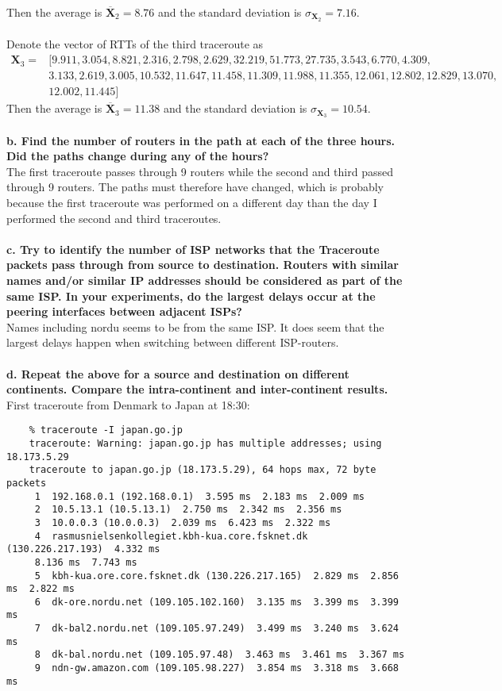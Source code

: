 Then the average is $\overline{\mathbf{X}}_2 = 8.76$ and the standard deviation is $\sigma_{\mathbf{X}_2} = 7.16$. \\
\\
Denote the vector of RTTs of the third traceroute as
\begin{equation*}
\begin{split}
    \mathbf{X}_3 = &[
        9.911, 3.054, 8.821,
        2.316, 2.798, 2.629,
        32.219, 51.773, 27.735,
        3.543, 6.770, 4.309, \\
        &3.133, 2.619, 3.005,
        10.532, 11.647, 11.458,
        11.309, 11.988, 11.355,
        12.061, 12.802, 12.829,
        13.070, \\
        &12.002, 11.445
    ]
\end{split}
\end{equation*}
Then the average is $\overline{\mathbf{X}}_3 = 11.38$ and the standard deviation is $\sigma_{\mathbf{X}_3} = 10.54$. \\
\\
\textbf{b. Find the number of routers in the path at each of the three hours. Did the paths change during any of the hours?} \\
The first traceroute passes through 9 routers while the second and third passed through 9 routers. The paths must therefore have changed, which is probably because the first traceroute was performed on a different day than the day I performed the second and third traceroutes. \\
\\
\textbf{c. Try to identify the number of ISP networks that the Traceroute packets pass through from source to destination. Routers with similar names and/or similar IP addresses should be considered as part of the same ISP. In your experiments, do the largest delays occur at the peering interfaces between adjacent ISPs?} \\
Names including nordu seems to be from the same ISP. It does seem that the largest delays happen when switching between different ISP-routers. \\
\\
\textbf{d. Repeat the above for a source and destination on different continents. Compare the intra-continent and inter-continent results.} \\
First traceroute from Denmark to Japan at 18:30:
\begin{verbatim}
    % traceroute -I japan.go.jp
    traceroute: Warning: japan.go.jp has multiple addresses; using 18.173.5.29
    traceroute to japan.go.jp (18.173.5.29), 64 hops max, 72 byte packets
     1  192.168.0.1 (192.168.0.1)  3.595 ms  2.183 ms  2.009 ms
     2  10.5.13.1 (10.5.13.1)  2.750 ms  2.342 ms  2.356 ms
     3  10.0.0.3 (10.0.0.3)  2.039 ms  6.423 ms  2.322 ms
     4  rasmusnielsenkollegiet.kbh-kua.core.fsknet.dk (130.226.217.193)  4.332 ms  
     8.136 ms  7.743 ms
     5  kbh-kua.ore.core.fsknet.dk (130.226.217.165)  2.829 ms  2.856 ms  2.822 ms
     6  dk-ore.nordu.net (109.105.102.160)  3.135 ms  3.399 ms  3.399 ms
     7  dk-bal2.nordu.net (109.105.97.249)  3.499 ms  3.240 ms  3.624 ms
     8  dk-bal.nordu.net (109.105.97.48)  3.463 ms  3.461 ms  3.367 ms
     9  ndn-gw.amazon.com (109.105.98.227)  3.854 ms  3.318 ms  3.668 ms
\end{verbatim}
